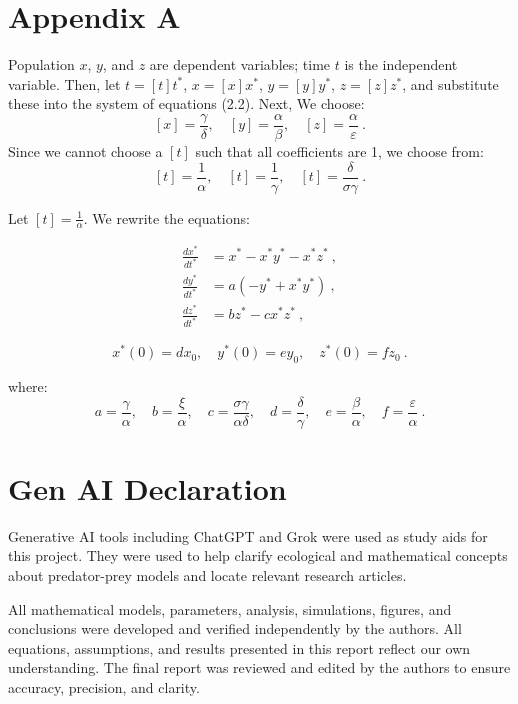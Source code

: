 \documentclass{article}
\begin{document}
\section*{Appendix A}
Population $x$, $y$, and $z$ are dependent variables; time $t$ is the independent variable. Then, let $t = [t]t^*$, $x = [x]x^*$, $y = [y]y^*$, $z = [z]z^*$, and substitute these into the system of equations (2.2). Next, We choose:
$$
[x] = \frac{\gamma}{\delta}, \quad [y]= \frac{\alpha}{\beta}, \quad[z] = \frac{\alpha}{\varepsilon} \ .
$$
Since we cannot choose a $[t]$ such that all coefficients are 1, we choose from:
$$
[t] = \frac{1}{\alpha}, \quad [t] = \frac{1}{\gamma}, \quad [t] = \frac{\delta}{\sigma \gamma} \ .
$$

\noindent Let $[t] = \frac{1}{\alpha}$. We rewrite the equations:

$$
\begin{aligned}
\frac{dx^*}{dt^*} &= x^* - x^*y^* - x^*z^* \ , \\
\frac{dy^*}{dt^*} &= a(-y^* + x^*y^*) \ , \\
\frac{dz^*}{dt^*} &= bz^* - cx^*z^* \ ,
\end{aligned}
$$

$$
x^*(0) = dx_0, \quad y^*(0) = ey_0, \quad z^*(0) = fz_0 \ .
$$

\noindent where:
$$
a = \frac{\gamma}{\alpha},\quad b = \frac{\xi}{\alpha}, \quad c = \frac{\sigma \gamma}{\alpha \delta},  \quad d = \frac{\delta}{\gamma}, \quad e = \frac{\beta}{\alpha},  \quad f = \frac{\varepsilon}{\alpha} \ .
$$

\vspace{1em}
\section*{Gen AI Declaration}
Generative AI tools including ChatGPT and Grok were used as study aids for this project. They were used to help clarify ecological and mathematical concepts about predator-prey models and locate relevant research articles.

\vspace{5mm}

\noindent All mathematical models, parameters, analysis, simulations, figures, and conclusions were developed and verified independently by the authors. All equations, assumptions, and results presented in this report reflect our own understanding. The final report was reviewed and edited by the authors to ensure accuracy, precision, and clarity.
\end{document}
